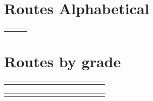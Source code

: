\twocolumn
{}
\begin{flushleft}
\section{Routes Alphabetical}
\begin{center}
\begin{supertabular}{p{0.65\linewidth}r}
  &  \\
\end{supertabular}
\end{center}
\section{Routes by grade}
\begin{center}
\begin{supertabular}{p{0.18\linewidth}p{0.13\linewidth}p{0.45\linewidth}p{0.08\linewidth}}
 && &  \\
\end{supertabular}
\begin{supertabular}{p{0.13\linewidth}p{0.18\linewidth}p{0.45\linewidth}p{0.08\linewidth}}
&& &  \\
\end{supertabular}
\end{center}
\end{flushleft}
\onecolumn
\clearpage